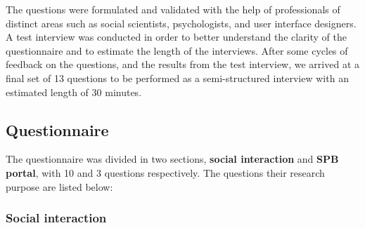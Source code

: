 \documentclass{sigchi}
\begin{document}
The questions were formulated and validated with the help of professionals of distinct areas such as social scientists, psychologists, and user interface designers.  A test interview was conducted in order to better understand the clarity of the questionnaire and to estimate the length of the interviews. After some cycles of feedback on the questions, and the results from the test interview, we arrived at a final set of 13 questions to be performed as a semi-structured interview with an estimated length of 30 minutes. 

\subsection{Questionnaire}
The questionnaire was divided in two sections, \textbf{social interaction} and \textbf{SPB portal}, with 10 and 3 questions respectively. The questions their research purpose are listed below:

\subsubsection{Social interaction}
\end{document}
